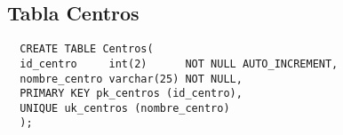 \subsection{Tabla Centros}

\begin{verbatim}
  CREATE TABLE Centros(
  id_centro     int(2)      NOT NULL AUTO_INCREMENT,
  nombre_centro varchar(25) NOT NULL,
  PRIMARY KEY pk_centros (id_centro),
  UNIQUE uk_centros (nombre_centro)
  );
\end{verbatim}